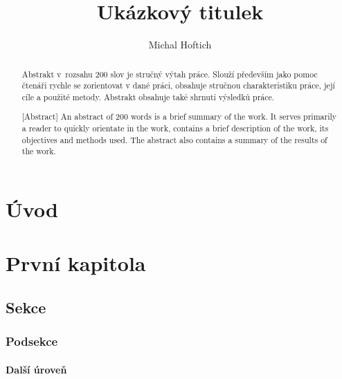 \documentclass[oneside,a4paper,12pt]{book}
\author{Michal Hoftich}
\title{Ukázkový titulek}
\begin{document}
\frontmatter
{}


\begin{abstract}
Abstrakt v rozsahu 200 slov je stručný výtah práce. Slouží především jako pomoc
čtenáři rychle se zorientovat v dané práci, obsahuje stručnou charakteristiku
práce, její cíle a použité metody. Abstrakt obsahuje také shrnutí výsledků
práce.
\SavedKeywords
\end{abstract}

\begin{abstract}[Abstract]
An abstract of 200 words is a brief summary of the work. It serves primarily  
a reader to quickly orientate in the work, contains a brief description of the
work, its objectives and methods used. The abstract also contains a summary of
the results of the work.
\end{abstract}

\tableofcontents
\chapter{Úvod}
\mainmatter
\chapter{První kapitola}
\section{Sekce}
\subsection{Podsekce}
\subsubsection{Další úroveň}
\lipsum[1-3]
\end{document}
